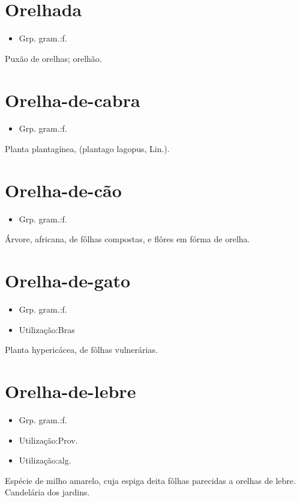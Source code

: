 \section{Orelhada}
\begin{itemize}
\item {Grp. gram.:f.}
\end{itemize}
Puxão de orelhas; orelhão.
\section{Orelha-de-cabra}
\begin{itemize}
\item {Grp. gram.:f.}
\end{itemize}
Planta plantagínea, (\textunderscore plantago lagopus\textunderscore , Lin.).
\section{Orelha-de-cão}
\begin{itemize}
\item {Grp. gram.:f.}
\end{itemize}
Árvore, africana, de fôlhas compostas, e flôres em fórma de orelha.
\section{Orelha-de-gato}
\begin{itemize}
\item {Grp. gram.:f.}
\end{itemize}
\begin{itemize}
\item {Utilização:Bras}
\end{itemize}
Planta hypericácea, de fôlhas vulnerárias.
\section{Orelha-de-lebre}
\begin{itemize}
\item {Grp. gram.:f.}
\end{itemize}
\begin{itemize}
\item {Utilização:Prov.}
\end{itemize}
\begin{itemize}
\item {Utilização:alg.}
\end{itemize}
Espécie de milho amarelo, cuja espiga deita fôlhas parecidas a orelhas de lebre.
Candelária dos jardins.
